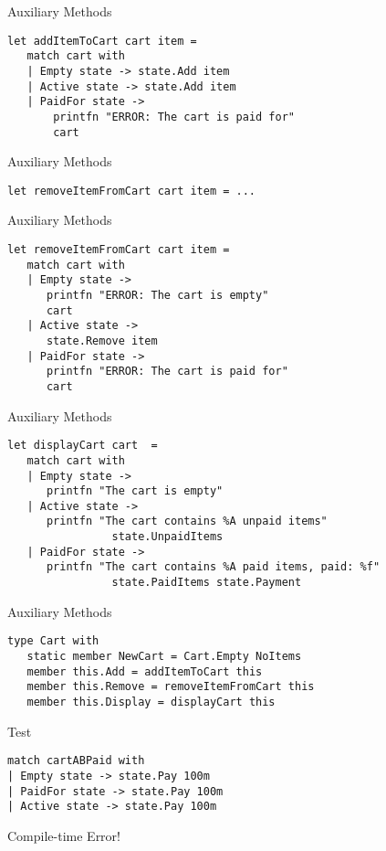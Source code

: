 \documentclass{beamer}
\begin{document}
\begin{frame}[fragile]{Auxiliary Methods}
  \begin{verbatim}
let addItemToCart cart item =
   match cart with
   | Empty state -> state.Add item
   | Active state -> state.Add item
   | PaidFor state ->
       printfn "ERROR: The cart is paid for"
       cart
  \end{verbatim}
\end{frame}

\begin{frame}[fragile]{Auxiliary Methods}
  \begin{verbatim}
let removeItemFromCart cart item = ...
  \end{verbatim}
\end{frame}

\begin{frame}[fragile]{Auxiliary Methods}
  \begin{verbatim}
let removeItemFromCart cart item =
   match cart with
   | Empty state ->
      printfn "ERROR: The cart is empty"
      cart
   | Active state ->
      state.Remove item
   | PaidFor state ->
      printfn "ERROR: The cart is paid for"
      cart
  \end{verbatim}
\end{frame}

\begin{frame}[fragile]{Auxiliary Methods}
  \begin{verbatim}
let displayCart cart  =
   match cart with
   | Empty state ->
      printfn "The cart is empty"
   | Active state ->
      printfn "The cart contains %A unpaid items"
                state.UnpaidItems
   | PaidFor state ->
      printfn "The cart contains %A paid items, paid: %f"
                state.PaidItems state.Payment
  \end{verbatim}
\end{frame}

\begin{frame}[fragile]{Auxiliary Methods}
  \begin{verbatim}
type Cart with
   static member NewCart = Cart.Empty NoItems
   member this.Add = addItemToCart this
   member this.Remove = removeItemFromCart this
   member this.Display = displayCart this
  \end{verbatim}
\end{frame}

\begin{frame}[fragile]{Test}
  \begin{verbatim}
match cartABPaid with
| Empty state -> state.Pay 100m
| PaidFor state -> state.Pay 100m
| Active state -> state.Pay 100m
  \end{verbatim}
  \pause
  Compile-time Error!
\end{frame}
\end{document}

